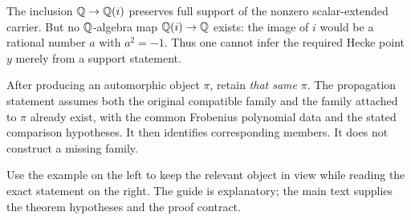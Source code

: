The inclusion $\mathbb Q\to\mathbb Q(i)$ preserves full support of the nonzero scalar-extended carrier. But no $\mathbb Q$-algebra map $\mathbb Q(i)\to\mathbb Q$ exists: the image of $i$ would be a rational number $a$ with $a^2=-1$. Thus one cannot infer the required Hecke point $y$ merely from a support statement.

After producing an automorphic object $\pi$, retain \emph{that same} $\pi$. The propagation statement assumes both the original compatible family and the family attached to $\pi$ already exist, with the common Frobenius polynomial data and the stated comparison hypotheses. It then identifies corresponding members. It does not construct a missing family.


Use the example on the left to keep the relevant object in view while reading the exact statement on the right. The guide is explanatory; the main text supplies the theorem hypotheses and the proof contract.

